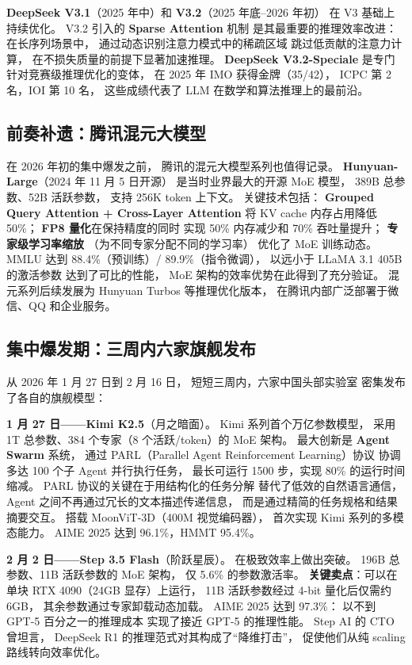 \textbf{DeepSeek V3.1}（2025 年中）和
\textbf{V3.2}（2025 年底--2026 年初）
在 V3 基础上持续优化。
V3.2 引入的 \textbf{Sparse Attention} 机制
是其最重要的推理效率改进：
在长序列场景中，
通过动态识别注意力模式中的稀疏区域
跳过低贡献的注意力计算，
在不损失质量的前提下显著加速推理。
\textbf{DeepSeek V3.2-Speciale} 是专门针对竞赛级推理优化的变体，
在 2025 年 IMO 获得金牌（35/42），
ICPC 第 2 名，IOI 第 10 名，
这些成绩代表了 LLM 在数学和算法推理上的最前沿。

\subsection{前奏补遗：腾讯混元大模型}

在 2026 年初的集中爆发之前，
腾讯的混元大模型系列也值得记录。
\textbf{Hunyuan-Large}（2024 年 11 月 5 日开源）
是当时业界最大的开源 MoE 模型，
389B 总参数、52B 活跃参数，
支持 256K token 上下文。
关键技术包括：
\textbf{Grouped Query Attention + Cross-Layer Attention}
将 KV cache 内存占用降低 50\%；
\textbf{FP8 量化}在保持精度的同时
实现 50\% 内存减少和 70\% 吞吐量提升；
\textbf{专家级学习率缩放}
（为不同专家分配不同的学习率）
优化了 MoE 训练动态。
MMLU 达到 88.4\%（预训练）/ 89.9\%（指令微调），
以远小于 LLaMA 3.1 405B 的激活参数
达到了可比的性能，
MoE 架构的效率优势在此得到了充分验证。
混元系列后续发展为 Hunyuan Turbos 等推理优化版本，
在腾讯内部广泛部署于微信、QQ 和企业服务。

\subsection{集中爆发期：三周内六家旗舰发布}

从 2026 年 1 月 27 日到 2 月 16 日，
短短三周内，六家中国头部实验室
密集发布了各自的旗舰模型：

\textbf{1 月 27 日——Kimi K2.5}（月之暗面）。
Kimi 系列首个万亿参数模型，
采用 1T 总参数、384 个专家（8 个活跃/token）的 MoE 架构。
最大创新是 \textbf{Agent Swarm} 系统，
通过 PARL（Parallel Agent Reinforcement Learning）协议
协调多达 100 个子 Agent 并行执行任务，
最长可运行 1500 步，实现 80\% 的运行时间缩减。
PARL 协议的关键在于用结构化的任务分解
替代了低效的自然语言通信，
Agent 之间不再通过冗长的文本描述传递信息，
而是通过精简的任务规格和结果摘要交互。
搭载 MoonViT-3D（400M 视觉编码器），
首次实现 Kimi 系列的多模态能力。
AIME 2025 达到 96.1\%，HMMT 95.4\%。

\textbf{2 月 2 日——Step 3.5 Flash}（阶跃星辰）。
在极致效率上做出突破。
196B 总参数、11B 活跃参数的 MoE 架构，
仅 5.6\% 的参数激活率。
\textbf{关键卖点}：可以在单块 RTX 4090（24GB 显存）上运行，
11B 活跃参数经过 4-bit 量化后仅需约 6GB，
其余参数通过专家卸载动态加载。
AIME 2025 达到 97.3\%：
以不到 GPT-5 百分之一的推理成本
实现了接近 GPT-5 的推理性能。
Step AI 的 CTO 曾坦言，
DeepSeek R1 的推理范式对其构成了“降维打击”，
促使他们从纯 scaling 路线转向效率优化。

